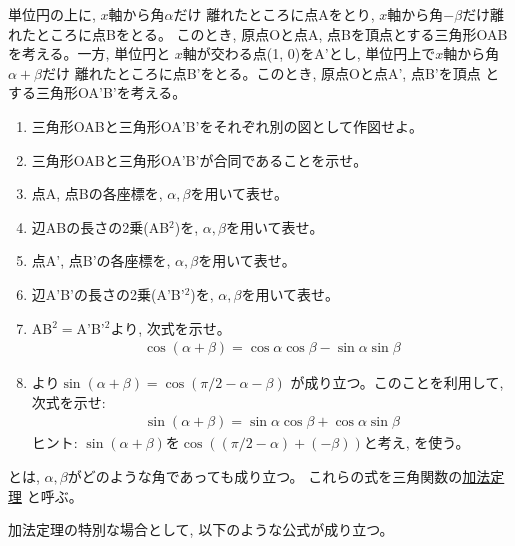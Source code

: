 \begin{q}\label{q:trig_kahouteiri} 単位円の上に, $x$軸から角$\alpha$だけ
離れたところに点Aをとり, $x$軸から角$-\beta$だけ離れたところに点Bをとる。
このとき, 原点Oと点A, 点Bを頂点とする三角形OABを考える。一方, 単位円と
$x$軸が交わる点(1, 0)をA'とし, 単位円上で$x$軸から角$\alpha+\beta$だけ
離れたところに点B'をとる。このとき, 原点Oと点A', 点B'を頂点
とする三角形OA'B'を考える。
\begin{enumerate}
\item 三角形OABと三角形OA'B'をそれぞれ別の図として作図せよ。
\item 三角形OABと三角形OA'B'が合同であることを示せ。
\item 点A, 点Bの各座標を, $\alpha, \beta$を用いて表せ。
\item 辺ABの長さの2乗(AB$^2$)を, $\alpha, \beta$を用いて表せ。
\item 点A', 点B'の各座標を, $\alpha, \beta$を用いて表せ。
\item 辺A'B'の長さの2乗(A'B'$^2$)を, $\alpha, \beta$を用いて表せ。
\item AB$^2=$A'B'$^2$より, 次式を示せ。
\begin{eqnarray}
\cos(\alpha + \beta)=\cos\alpha \cos\beta - \sin\alpha \sin\beta\label{eq:add_sin1}
\end{eqnarray}
\item {}より$\sin(\alpha + \beta)=\cos(\pi/2-\alpha - \beta)$
が成り立つ。このことを利用して, 次式を示せ:
\begin{eqnarray}
\sin(\alpha + \beta)=\sin\alpha \cos\beta + \cos\alpha \sin\beta\label{eq:add_sin2}
\end{eqnarray}
ヒント: $\sin(\alpha + \beta)$を$\cos((\pi/2-\alpha) + (-\beta))$と考え, を使う。
\end{enumerate}\end{q}
とは, $\alpha, \beta$がどのような角であっても成り立つ。
これらの式を三角関数の\underline{加法定理} と呼ぶ。

加法定理の特別な場合として, 以下のような公式が成り立つ。

